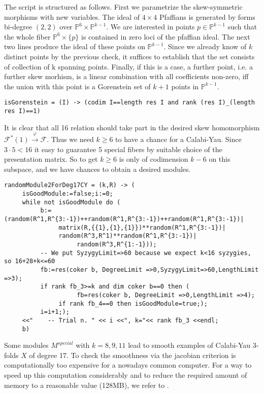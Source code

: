 \documentclass[12pt,leqno]{amsart}
\newcommand{\PP}{{\mathbb P}}
\newcommand{\kf}{{\mathcal F}}
\newlength{\ho}
\begin{document}
The script is structured as follows. 
First we parametrize the skew-symmetric morphisms with new variables.
The ideal of $4\times4$ Pfaffians is generated by forms bi-degree $(2,2)$
over $\PP^6 \times \PP^{k-1}$. We are interested in
points $p \in \PP^{k-1}$ such that the whole fiber 
$\PP^6 \times \{ p \}$ is contained in zero loci of the pfaffian
ideal. The next two lines produce the ideal of these points on
$\PP^{k-1}$. Since we already know of $k$ distinct points by the
previous check, it suffices to establish that the set consists of 
collection of k spanning points. Finally, if this is a case, a further
point, i.e. a further skew morhism, is a linear combination with all
coefficients non-zero, iff the union with this point is a Gorenstein set
of $k+1$ points in $\PP^{k-1}$.


{\scriptsize
\begin{verbatim} 
isGorenstein = (I) -> (codim I==length res I and rank (res I)_(length res I)==1)
\end{verbatim}}



It is clear that all 16 relation should take part in the desired
skew homomorphism $\kf^*(1) \stackrel{\varphi}{\longrightarrow} \kf$.
Thus we need $k \ge 6$ to have a chance for a Calabi-Yau.
Since $3\cdot5 <16$ it easy to guarantee 5 special fibers by suitable choice
of the presentation matrix. 
So to get $k \ge 6$ is only of codimension $k-6$ on this subspace, 
and we have chances to obtain a desired modules.
{\scriptsize
\begin{verbatim} 
randomModule2ForDeg17CY = (k,R) -> (
     isGoodModule:=false;i:=0;
     while not isGoodModule do (
          b:=(random(R^1,R^{3:-1})++random(R^1,R^{3:-1})++random(R^1,R^{3:-1})|
               matrix(R,{{1},{1},{1}})**random(R^1,R^{3:-1})|
               random(R^3,R^1)**random(R^1,R^{3:-1})|
                    random(R^3,R^{1:-1}));
          -- We put SyzygyLimit=>60 because we expect k<16 syzygies, so 16+28+k<=60
          fb:=res(coker b, DegreeLimit =>0,SyzygyLimit=>60,LengthLimit =>3);
          if rank fb_3>=k and dim coker b==0 then (
                    fb=res(coker b, DegreeLimit =>0,LengthLimit =>4);
               if rank fb_4==0 then isGoodModule=true;);
          i=i+1;);
     <<"    -- Trial n. " << i <<", k="<< rank fb_3 <<endl;
     b)
\end{verbatim}}


\medskip
Some modules $M^{special}$ with $k=8,9,11$ lead to smooth examples of 
Calabi-Yau 3-folds $X$ of degree 17. 
To check the smoothness via the jacobian criterion 
is computationally too expensive for a nowadays common computer.
For a way to speed up this computation considerably 
and to reduce the required amount of memory to a reasonable value (128MB), 
we refer to \cite{To}.
\end{document}
